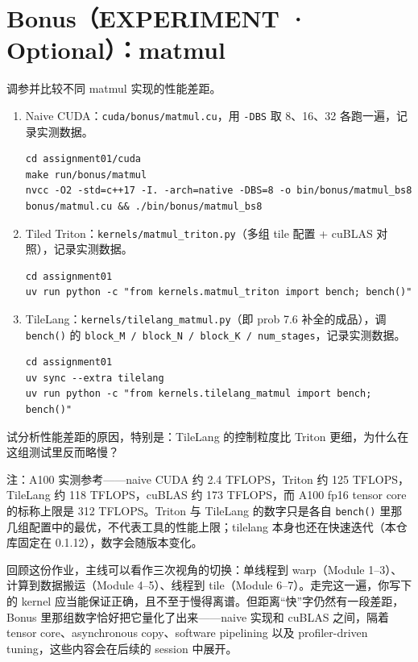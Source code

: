 \documentclass[11pt,a4paper,fontset=none]{ctexart}
\begin{document}
\clearpage
\section*{Bonus（EXPERIMENT · Optional）：matmul}

调参并比较不同 matmul 实现的性能差距。

\begin{enumerate}[label=(\alph*)]
  \item Naive CUDA：\texttt{cuda/bonus/matmul.cu}，用 \texttt{-DBS} 取 8、16、32 各跑一遍，记录实测数据。
\begin{lstlisting}
cd assignment01/cuda
make run/bonus/matmul
nvcc -O2 -std=c++17 -I. -arch=native -DBS=8 -o bin/bonus/matmul_bs8 bonus/matmul.cu && ./bin/bonus/matmul_bs8
\end{lstlisting}
  \item Tiled Triton：\texttt{kernels/matmul\_triton.py}（多组 tile 配置 + cuBLAS 对照），记录实测数据。
\begin{lstlisting}
cd assignment01
uv run python -c "from kernels.matmul_triton import bench; bench()"
\end{lstlisting}
  \item TileLang：\texttt{kernels/tilelang\_matmul.py}（即 prob 7.6 补全的成品），调 \texttt{bench()} 的 \texttt{block\_M / block\_N / block\_K / num\_stages}，记录实测数据。
\begin{lstlisting}
cd assignment01
uv sync --extra tilelang
uv run python -c "from kernels.tilelang_matmul import bench; bench()"
\end{lstlisting}
\end{enumerate}

试分析性能差距的原因，特别是：TileLang 的控制粒度比 Triton 更细，为什么在这组测试里反而略慢？

注：A100 实测参考——naive CUDA 约 2.4 TFLOPS，Triton 约 125 TFLOPS，TileLang 约 118 TFLOPS，cuBLAS 约 173 TFLOPS，而 A100 fp16 tensor core 的标称上限是 312 TFLOPS。Triton 与 TileLang 的数字只是各自 \texttt{bench()} 里那几组配置中的最优，不代表工具的性能上限；tilelang 本身也还在快速迭代（本仓库固定在 0.1.12），数字会随版本变化。
\begin{lookback}
回顾这份作业，主线可以看作三次视角的切换：单线程到 warp（Module 1--3）、计算到数据搬运（Module 4--5）、线程到 tile（Module 6--7）。走完这一遍，你写下的 kernel 应当能保证正确，且不至于慢得离谱。但距离“快”字仍然有一段差距，Bonus 里那组数字恰好把它量化了出来——naive 实现和 cuBLAS 之间，隔着 tensor core、asynchronous copy、software pipelining 以及 profiler-driven tuning，这些内容会在后续的 session 中展开。
\end{lookback}
\end{document}
